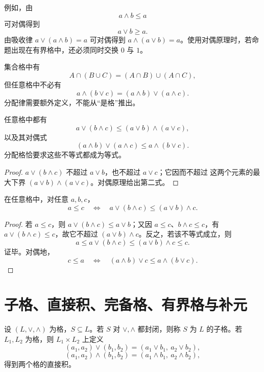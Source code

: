 例如，由
\[
a\wedge b\le a
\]
可对偶得到
\[
a\vee b\ge a.
\]
由吸收律 $a\vee(a\wedge b)=a$ 可对偶得到 $a\wedge(a\vee b)=a$。使用对偶原理时，若命题出现在有界格中，还必须同时交换 $0$ 与 $1$。

\begin{pitfall}[一般格不一定满足分配律]\label{lattice-distribution-pitfall}
  集合格中有
  \[
  A\cap(B\cup C)=(A\cap B)\cup(A\cap C),
  \]
  但任意格中不必有
  \[
  a\wedge(b\vee c)=(a\wedge b)\vee(a\wedge c).
  \]
  分配律需要额外定义，不能从“是格”推出。
\end{pitfall}

\begin{theorem}[格的分配不等式]\label{lattice-distributive-inequalities}
  任意格中都有
  \[
  a\vee(b\wedge c)\le (a\vee b)\wedge(a\vee c),
  \]
  以及其对偶式
  \[
  (a\wedge b)\vee(a\wedge c)\le a\wedge(b\vee c).
  \]
  分配格恰要求这些不等式都成为等式。
\end{theorem}

\begin{proof}
  $a\vee(b\wedge c)$ 不超过 $a\vee b$，也不超过 $a\vee c$；它因而不超过
  这两个元素的最大下界 $(a\vee b)\wedge(a\vee c)$。对偶原理给出第二式。
\end{proof}

\begin{theorem}[格的模不等式]\label{lattice-modular-inequality}
  在任意格中，对任意 $a,b,c$，
  \[
  a\le c\quad\Longleftrightarrow\quad
  a\vee(b\wedge c)\le(a\vee b)\wedge c.
  \]
\end{theorem}

\begin{proof}
  若 $a\le c$，则 $a\vee(b\wedge c)\le a\vee b$；又因
  $a\le c$、$b\wedge c\le c$，有 $a\vee(b\wedge c)\le c$，故它不超过
  $(a\vee b)\wedge c$。反之，若该不等式成立，则
  \[
  a\le a\vee(b\wedge c)\le(a\vee b)\wedge c\le c.
  \]
  证毕。对偶地，
  \[
  c\le a\quad\Longleftrightarrow\quad
  (a\wedge b)\vee c\le a\wedge(b\vee c).
  \]
\end{proof}

\section{子格、直接积、完备格、有界格与补元}

\begin{definition}[子格与直接积]\label{sublattice-product}
  设 $(L,\vee,\wedge)$ 为格，$S\subseteq L$。若 $S$ 对 $\vee,\wedge$ 都封闭，则称 $S$ 为 $L$ 的子格。若 $L_1,L_2$ 为格，则 $L_1\times L_2$ 上定义
  \[
  (a_1,a_2)\vee(b_1,b_2)=(a_1\vee b_1,\ a_2\vee b_2),
  \]
  \[
  (a_1,a_2)\wedge(b_1,b_2)=(a_1\wedge b_1,\ a_2\wedge b_2),
  \]
  得到两个格的直接积。
\end{definition}


